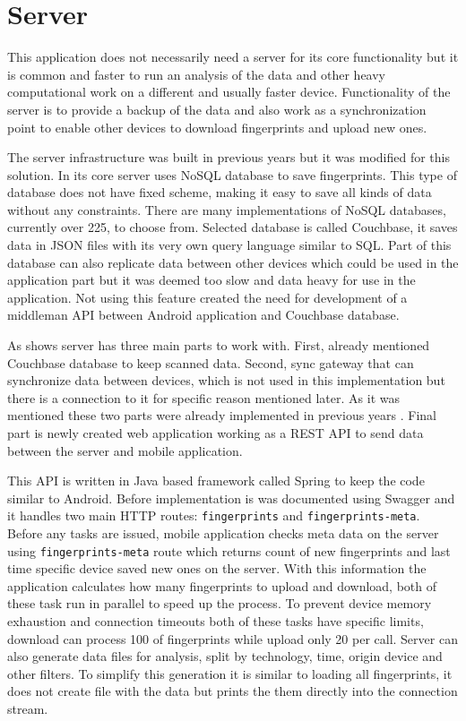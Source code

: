 \section{Server}\label{sec:Server}
This application does not necessarily need a server for its core functionality but it is common and faster to run an analysis of the data and other heavy computational work on a different and usually faster device. Functionality of the server is to provide a backup of the data and also work as a synchronization point to enable other devices to download fingerprints and upload new ones.

The server infrastructure was built in previous years \cite{IILUBLEB} but it was modified for this solution. In its core server uses NoSQL database to save fingerprints. This type of database does not have fixed scheme, making it easy to save all kinds of data without any constraints. There are many implementations of NoSQL databases, currently over 225, to choose from. Selected database is called Couchbase, it saves data in JSON files with its very own query language similar to SQL. Part of this database can also replicate data between other devices which could be used in the application part but it was deemed too slow and data heavy for use in the application. Not using this feature created the need for development of a middleman API between Android application and Couchbase database.

As  shows server has three main parts to work with. First, already mentioned Couchbase database to keep scanned data. Second, sync gateway that can synchronize data between devices, which is not used in this implementation but there is a connection to it for specific reason mentioned later. As it was mentioned these two parts were already implemented in previous years \cite{IILUBLEB}. Final part is newly created web application working as a REST API to send data between the server and mobile application. 

This API is written in Java based framework called Spring to keep the code similar to Android. Before implementation is was documented using Swagger and it handles two main HTTP routes: \verb|fingerprints| and  \verb|fingerprints-meta|. Before any tasks are issued, mobile application checks meta data on the server using \verb|fingerprints-meta| route which returns count of new fingerprints and last time specific device saved new ones on the server. With this information the application calculates how many fingerprints to upload and download, both of these task run in parallel to speed up the process. To prevent device memory exhaustion and connection timeouts both of these tasks have specific limits, download can process 100 of fingerprints while upload only 20 per call. Server can also generate data files for analysis, split by technology, time, origin device and other filters. To simplify this generation it is similar to loading all fingerprints, it does not create file with the data but prints the them directly into the connection stream.

